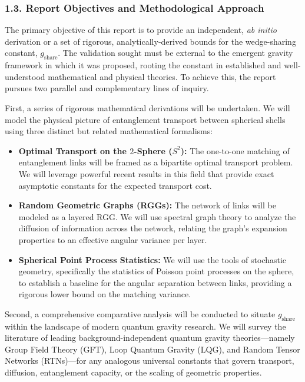 \documentclass[11pt]{article}
\begin{document}
\subsubsection*{1.3. Report Objectives and Methodological Approach}
The primary objective of this report is to provide an independent, \emph{ab initio} derivation or a set of rigorous, analytically-derived bounds for the wedge-sharing constant, $g_{\mathrm{share}}$. The validation sought must be external to the emergent gravity framework in which it was proposed, rooting the constant in established and well-understood mathematical and physical theories. To achieve this, the report pursues two parallel and complementary lines of inquiry.

First, a series of rigorous mathematical derivations will be undertaken. We will model the physical picture of entanglement transport between spherical shells using three distinct but related mathematical formalisms:

\begin{itemize}
  \item \textbf{Optimal Transport on the $2$-Sphere ($S^2$):} The one-to-one matching of entanglement links will be framed as a bipartite optimal transport problem. We will leverage powerful recent results in this field that provide exact asymptotic constants for the expected transport cost.
  \item \textbf{Random Geometric Graphs (RGGs):} The network of links will be modeled as a layered RGG. We will use spectral graph theory to analyze the diffusion of information across the network, relating the graph’s expansion properties to an effective angular variance per layer.
  \item \textbf{Spherical Point Process Statistics:} We will use the tools of stochastic geometry, specifically the statistics of Poisson point processes on the sphere, to establish a baseline for the angular separation between links, providing a rigorous lower bound on the matching variance.
\end{itemize}

Second, a comprehensive comparative analysis will be conducted to situate $g_{\mathrm{share}}$ within the landscape of modern quantum gravity research. We will survey the literature of leading background-independent quantum gravity theories—namely Group Field Theory (GFT), Loop Quantum Gravity (LQG), and Random Tensor Networks (RTNs)—for any analogous universal constants that govern transport, diffusion, entanglement capacity, or the scaling of geometric properties.
\end{document}
